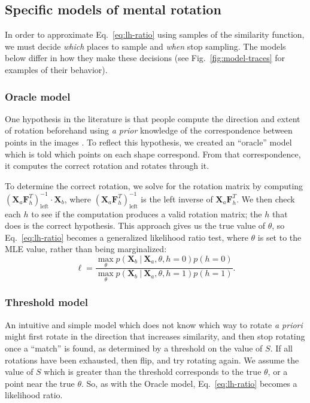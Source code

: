 \documentclass[10pt,letterpaper]{article}
\newcommand{\Xa}[0]{\mathbf{X}_a}
\newcommand{\Xb}[0]{\mathbf{X}_b}
\newcommand{\F}[0]{\mathbf{F}}
\newcommand{\hi}[0]{h=0}
\newcommand{\hf}[0]{h=1}
\newcommand{\Oc}[0]{Oracle}
\begin{document}
\subsection{Specific models of mental rotation}

In order to approximate Eq.~\ref{eq:lh-ratio} using samples of the
similarity function, we must decide \textit{which} places to sample
and \textit{when} stop sampling. The models below differ in how they
make these decisions (see Fig.~\ref{fig:model-traces} for examples of
their behavior).

\subsubsection{Oracle model}

One hypothesis in the literature is that people compute the direction
and extent of rotation beforehand using \textit{a prior} knowledge of
the correspondence between points in the images
\cite{Funt:1983wn,Just:1985uu}.  To reflect this hypothesis, we
created an ``oracle'' model which is told which points on each shape
correspond. From that correspondence, it computes the correct rotation
and rotates through it.

To determine the correct rotation, we solve for the rotation matrix by
computing $(\Xa \F_h^T)_\mathrm{left}^{-1}\cdot{}\Xb$, where
$(\Xa\F_h^T)_\mathrm{left}^{-1}$ is the left inverse of
$\Xa\F_h^T$. We then check each $h$ to see if the computation produces
a valid rotation matrix; the $h$ that does is the correct
hypothesis. This approach gives us the true value of $\theta$, so
Eq.~\ref{eq:lh-ratio} becomes a generalized likelihood ratio test,
where $\theta$ is set to the MLE value, rather than being
marginalized:
\begin{equation}
  \ell = \frac{\max_\theta p(\Xb\ \vert\ \Xa, \theta, \hi)p(\hi)}{\max_\theta p(\Xb\ \vert\ \Xa, \theta, \hf)p(\hf)}.
  \label{eq:mle-lh-ratio}
\end{equation}

\subsubsection{Threshold model}

An intuitive and simple model which does not know which way to rotate
\textit{a priori} might first rotate in the direction that increases
similarity, and then stop rotating once a ``match'' is found, as
determined by a threshold on the value of $S$. If all rotations have
been exhausted, then flip, and try rotating again. We assume the value
of $S$ which is greater than the threshold corresponds to the true
$\theta$, or a point near the true $\theta$. So, as with the \Oc{}
model, Eq.~\ref{eq:lh-ratio} becomes a likelihood ratio.
\end{document}
